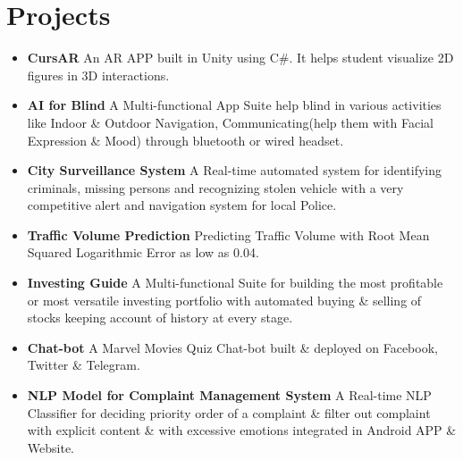 \documentclass[letterpaper,11pt]{article}
\newcommand{\resumeItem}[2]{
  \item\small{
    \textbf{#1}{ #2 \vspace{-2pt}}
  }
}
\newcommand{\resumeSubItem}[2]{\resumeItem{#1}{#2}\vspace{-4pt}}
\newcommand{\resumeSubHeadingListStart}{\begin{itemize}[leftmargin=*]}
\newcommand{\resumeSubHeadingListEnd}{\end{itemize}}
\begin{document}
\section{Projects}
  \resumeSubHeadingListStart
    \resumeSubItem{CursAR}
      {An AR APP built in Unity using C\#. It helps student visualize 2D figures in 3D interactions.}
    \resumeSubItem{AI for Blind}
      {A Multi-functional App Suite help blind in various activities like Indoor \& Outdoor Navigation, Communicating(help them with Facial Expression \& Mood) through bluetooth or wired headset.}
    \resumeSubItem{City Surveillance System}
      {A Real-time automated system for identifying criminals, missing persons and recognizing stolen vehicle with a very competitive alert and navigation system for local Police. 
      }
    \resumeSubItem{Traffic Volume Prediction}
      {Predicting Traffic Volume with Root Mean Squared Logarithmic Error as low as 0.04.}
    \resumeSubItem{Investing Guide}
      {A Multi-functional Suite for building the most profitable or most versatile investing portfolio with automated buying \& selling of stocks keeping account of history at every stage.}
    \resumeSubItem{Chat-bot}
    {A Marvel Movies Quiz Chat-bot built \& deployed on Facebook, Twitter \& Telegram.}
    \resumeSubItem{NLP Model for Complaint Management System}
     {A Real-time NLP Classifier for deciding priority order of a complaint \& filter out complaint with explicit content \& with excessive emotions integrated in Android APP \& Website.}
  \resumeSubHeadingListEnd
\end{document}
